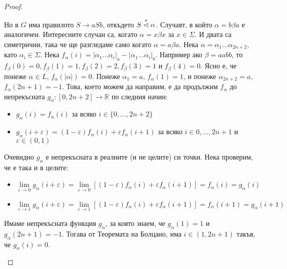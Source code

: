 \begin{proof}
\begin{itemize}
\begin{itemize}
                      Но в $G$ има правилото $S \rightarrow aSb$, откъдето $S \stackrel{*}{\vartriangleleft} \alpha$.
                      Случаят, в който $\alpha = b \beta a$ е аналогичен.
                      Интересните случаи са, когато $\alpha = x \beta x$ за $x \in \Sigma$.
                      И двата са симетрични, така че ще разгледаме само когато $\alpha = a \beta a$.
                      Нека $\alpha = \alpha_1 \dots \alpha_{2n + 2}$, като $\alpha_i \in \Sigma$.
                      Нека $f_\alpha(i) = |\alpha_1 \dots \alpha_i|_a - |\alpha_1 \dots \alpha_i|_b$.
                      Например ако $\beta = aabb$, то $f_\beta(0) = 0, f_\beta(1) = 1, f_\beta(2) = 2, f_\beta(3) = 1$ и $f_\beta(4) = 0$.
                      Ясно е, че понеже $\alpha \in L$, $f_\alpha(|\alpha|) = 0$. Понеже $\alpha_1 = a$, $f_\alpha(1) = 1$, и понеже $\alpha_{2n + 2} = a$, $f_\alpha(2n + 1) = -1$.
                      Това, което можем да направим, е да продължим $f_\alpha$ до непрекъсната $g_\alpha : [0, 2n + 2] \rightarrow \mathbb{R}$ по следния начин:
                      \begin{itemize}
                          \item $g_\alpha(i) = f_\alpha(i)$ за всяко $i \in \{ 0, \dots, 2n + 2 \}$
                          \item $g_\alpha(i + \varepsilon) = (1 - \varepsilon) f_\alpha(i) + \varepsilon f_\alpha(i + 1)$ за всяко $i \in { 0, \dots, 2n + 1}$ и $\varepsilon \in (0, 1)$
                      \end{itemize}
                      Очевидно $g_\alpha$ е непрекъсната в реалните (и не целите) си точки.
                      Нека проверим, че е така и в целите:
                      \begin{itemize}
                          \item $\lim\limits_{\varepsilon \rightarrow 0} g_\alpha(i + \varepsilon) = \lim\limits_{\varepsilon \rightarrow 0} [(1 - \varepsilon) f_\alpha(i) + \varepsilon f_\alpha(i + 1)] = f_\alpha(i) = g_\alpha(i)$
                          \item $\lim\limits_{\varepsilon \rightarrow 1} g_\alpha(i + \varepsilon) = \lim\limits_{\varepsilon \rightarrow 1} [(1 - \varepsilon) f_\alpha(i) + \varepsilon f_\alpha(i + 1)] = f_\alpha(i + 1) = g_\alpha(i + 1)$
                      \end{itemize}
                      Имаме непрекъсната функция $g_\alpha$, за която знаем, че $g_\alpha(1) = 1$ и $g_\alpha(2n + 1) = -1$.
                      Тогава от Теоремата на Болцано, има $i \in (1, 2n + 1)$ такъв, че $g_\alpha(i) = 0$.

\end{itemize}
\end{itemize}
\end{proof}
